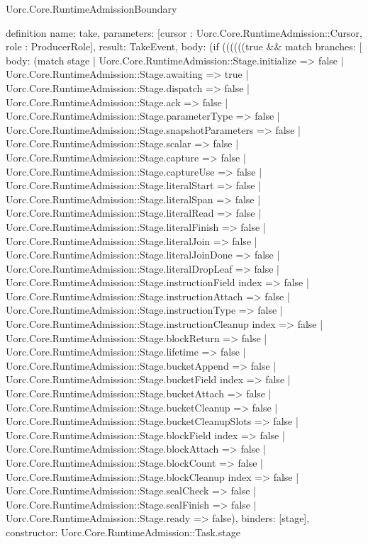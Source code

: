 \begin{lexlean}{Uorc.Core.RuntimeAdmissionBoundary}
\begin{semanticmodule}
definition{
  name: take,
  parameters: [cursor : Uorc.Core.RuntimeAdmission::Cursor, role : ProducerRole],
  result: TakeEvent,
  body: (if ((((((true && match{
    branches: [
      {
        body: (match stage
          | Uorc.Core.RuntimeAdmission::Stage.initialize => false
          | Uorc.Core.RuntimeAdmission::Stage.awaiting => true
          | Uorc.Core.RuntimeAdmission::Stage.dispatch => false
          | Uorc.Core.RuntimeAdmission::Stage.ack => false
          | Uorc.Core.RuntimeAdmission::Stage.parameterType => false
          | Uorc.Core.RuntimeAdmission::Stage.snapshotParameters => false
          | Uorc.Core.RuntimeAdmission::Stage.scalar => false
          | Uorc.Core.RuntimeAdmission::Stage.capture => false
          | Uorc.Core.RuntimeAdmission::Stage.captureUse => false
          | Uorc.Core.RuntimeAdmission::Stage.literalStart => false
          | Uorc.Core.RuntimeAdmission::Stage.literalSpan => false
          | Uorc.Core.RuntimeAdmission::Stage.literalRead => false
          | Uorc.Core.RuntimeAdmission::Stage.literalFinish => false
          | Uorc.Core.RuntimeAdmission::Stage.literalJoin => false
          | Uorc.Core.RuntimeAdmission::Stage.literalJoinDone => false
          | Uorc.Core.RuntimeAdmission::Stage.literalDropLeaf => false
          | Uorc.Core.RuntimeAdmission::Stage.instructionField index => false
          | Uorc.Core.RuntimeAdmission::Stage.instructionAttach => false
          | Uorc.Core.RuntimeAdmission::Stage.instructionType => false
          | Uorc.Core.RuntimeAdmission::Stage.instructionCleanup index => false
          | Uorc.Core.RuntimeAdmission::Stage.blockReturn => false
          | Uorc.Core.RuntimeAdmission::Stage.lifetime => false
          | Uorc.Core.RuntimeAdmission::Stage.bucketAppend => false
          | Uorc.Core.RuntimeAdmission::Stage.bucketField index => false
          | Uorc.Core.RuntimeAdmission::Stage.bucketAttach => false
          | Uorc.Core.RuntimeAdmission::Stage.bucketCleanup => false
          | Uorc.Core.RuntimeAdmission::Stage.bucketCleanupSlots => false
          | Uorc.Core.RuntimeAdmission::Stage.blockField index => false
          | Uorc.Core.RuntimeAdmission::Stage.blockAttach => false
          | Uorc.Core.RuntimeAdmission::Stage.blockCount => false
          | Uorc.Core.RuntimeAdmission::Stage.blockCleanup index => false
          | Uorc.Core.RuntimeAdmission::Stage.sealCheck => false
          | Uorc.Core.RuntimeAdmission::Stage.sealFinish => false
          | Uorc.Core.RuntimeAdmission::Stage.ready => false),
        binders: [stage],
        constructor: Uorc.Core.RuntimeAdmission::Task.stage
}}}
\end{semanticmodule}
\end{lexlean}
